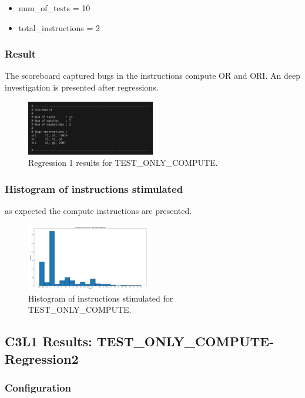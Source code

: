 \begin{itemize}
    \item num\_of\_tests = 10
    \item total\_instructions = 2
\end{itemize}

\subsubsection{Result}
The scoreboard captured bugs in the instructions compute OR and ORI. An deep investigation is presented after regressions.

\begin{figure}[H]
    \centering
    \includegraphics[width=0.5\textwidth]{./c3l1_img/toc_10_r.png}
    \caption{Regression 1 results for TEST\_ONLY\_COMPUTE.}
    \label{fig:toc_10_r}
\end{figure}

\subsubsection{Histogram of instructions stimulated}
as expected the compute instructions are presented.

\begin{figure}[H]
    \centering
    \includegraphics[width=0.48\textwidth]{./c3l1_img/toc_10.png}
    \caption{Histogram of instructions stimulated for TEST\_ONLY\_COMPUTE.}
    \label{fig:toc_10}
\end{figure}

\subsection{C3L1 Results: TEST\_ONLY\_COMPUTE-Regression2}

\subsubsection{Configuration}

